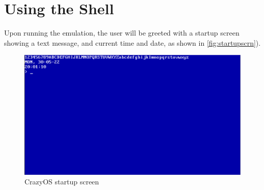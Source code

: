 \section{Using the Shell}
Upon running the emulation, the user will be greeted with a startup screen showing a text message, and current time and date, as shown in \autoref{fig:startupscrn}).
\begin{figure}[H]
  \centering
  \includegraphics[scale=0.25]{figures/startupscrn.eps}
  \caption{CrazyOS startup screen}
\label{fig:startupscrn}
\end{figure}


